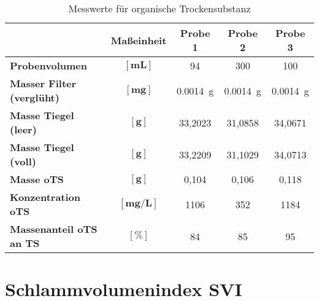 \vspace*{-2.5mm}
\renewcommand{\arraystretch}{1.2}
\begin{table}[h!]
	\centering
	\caption{Messwerte für organische Trockensubstanz}
	\label{tab:ots}
	\begin{tabulary}{1.7\textwidth}{L|C|CCC}
		\hline
		& \textbf{Maßeinheit}&	\textbf{Probe 1} & \textbf{Probe 2} & \textbf{Probe 3}  \\ 
		\hline
		\textbf{Probenvolumen}& $\boldsymbol{\left[\si{\milli \liter}\right]}$ & 94 	& 300 	& 100\\
		\textbf{Masser Filter (verglüht)} & $\boldsymbol{\left[\si{\milli \gram}\right]}$ & \SI{0,0014}{\gram}&\SI{0,0014}{\gram}&\SI{0,0014}{\gram}\\
		\textbf{Masse Tiegel (leer)} &  $\boldsymbol{\left[\si{\gram}\right]}$ & 33,2023 & 31,0858 & 34,0671\\
		\textbf{Masse Tiegel (voll)}& $\boldsymbol{\left[\si{\gram}\right]}$	& 33,2209 & 31,1029 & 34,0713\\
		\hline
		\textbf{Masse oTS} & $\boldsymbol{\left[\si{ \gram}\right]}$& 0,104 & 0,106 & 0,118\\
		\hline
		\textbf{Konzentration oTS}&$\boldsymbol{\left[\si{\milli \gram \per \liter}\right]}$& 1106 & 352 & 1184 \\
		\textbf{Massenanteil oTS an TS} & $\boldsymbol{\left[\%\right]}$&84&85&95\\
		\hline
	\end{tabulary}
\end{table}
\FloatBarrier
\vspace*{-2.5mm}

\section{Schlammvolumenindex SVI}

